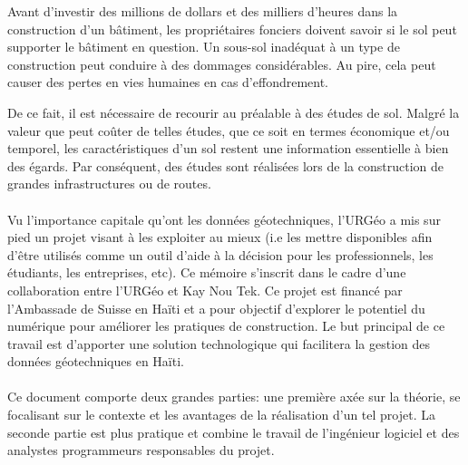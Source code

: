 
    \par
    Avant d’investir des millions de dollars et des milliers d’heures dans la 
    construction d'un bâtiment, les propriétaires fonciers doivent savoir si le 
    sol peut supporter le bâtiment en question.
    Un sous-sol inadéquat à un type de construction peut conduire à des 
    dommages considérables. Au pire, cela peut causer des pertes en vies humaines 
    en cas d'effondrement.
    \par
    De ce fait, il est nécessaire de recourir au préalable à des études de sol.   
    Malgré la valeur que peut coûter de telles études, que ce soit en termes
    économique et/ou temporel, les caractéristiques d’un sol restent une
    information essentielle à bien des égards. Par conséquent, des études sont 
    réalisées lors de la construction de grandes infrastructures ou de routes. 
    
    \paragraph{}
    Vu l'importance capitale qu'ont les données géotechniques, l'URGéo a
    mis sur pied un projet visant à les exploiter au mieux (i.e les mettre 
    disponibles afin d'être utilisés comme un outil d'aide à la décision 
    pour les professionnels, les étudiants, les entreprises, etc).
    Ce mémoire s'inscrit dans le cadre d'une collaboration entre
    l'URGéo et Kay Nou Tek. Ce projet est financé par l’Ambassade
    de Suisse en Haïti et a pour objectif d’explorer le potentiel 
    du numérique pour améliorer les pratiques de construction.
    Le but principal de ce travail est
    d'apporter une solution technologique  qui facilitera la 
    gestion des données géotechniques en Haïti.
    \paragraph{}
    Ce document comporte deux grandes parties: une première axée
    sur la théorie, se focalisant sur le contexte et les avantages
    de la réalisation d'un tel projet. La seconde partie est plus pratique
    et combine le travail de l'ingénieur logiciel et des analystes programmeurs responsables
    du projet.
